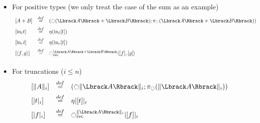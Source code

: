 \begin{itemize}
\item For positive types (we only treat the case of the sum as an example)
\[
\begin{array}{lcl}
\left[  A+B \right] &\defeq& \left( \modal(\Lbrack A \Rbrack + \Lbrack B
                        \Rbrack); \pi_\modal(\Lbrack A \Rbrack + \Lbrack B
                        \Rbrack)\right)\\[0.5em]
\left[  \mathrm{in}_\ell t \right] &\defeq& \eta (\mathrm{in}_\ell [t]) \\[0.5em]
\left[  \mathrm{in}_r t \right] &\defeq& \eta (\mathrm{in}_r [t]) \\[0.5em]
\left[ \langle f ,g\rangle\right] &\defeq& \modal_{\mathrm{rec}}^{\Lbrack A\Rbrack +
                                      \Lbrack B\Rbrack} \langle
                                      [f],[g]\rangle\\[0.5em]
\end{array}
\]
\item For truncations ($i\leqslant n$)
\[
\begin{array}{lcl}
  \left[  \|A\|_i \right] &\defeq& (\modal \| \Lbrack A\Rbrack  \|_i;
                                   \pi_\modal(\| \Lbrack A\Rbrack
                                   \|_i)) \\[0.5em]
  \left[ |t|_i \right] &\defeq& \eta |[t]|_i \\[0.5em]
  \left[ |f|_i \right] &\defeq& \modal_{\mathrm{rec}}^{\| \Lbrack
                                  A\Rbrack  \|_i} | [f] |_i
\end{array}
\]

\end{itemize}

